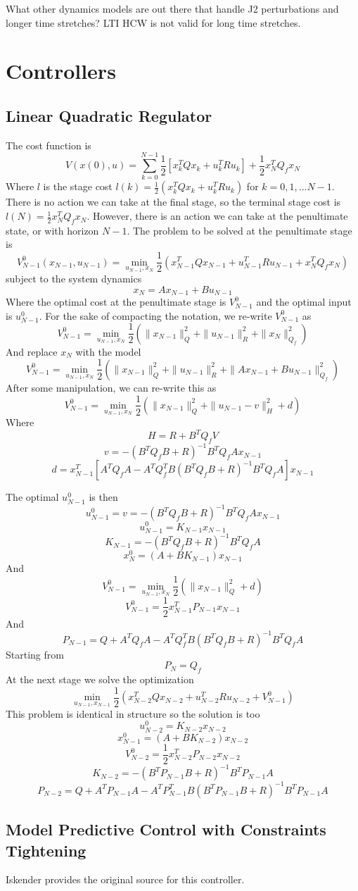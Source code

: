 \documentclass{article}
\begin{document}
What other dynamics models are out there that handle J2 perturbations and longer time stretches? LTI HCW is not valid for long time stretches.
\section{Controllers}
\subsection{Linear Quadratic Regulator}
The cost function is 
$$V(x(0), u) = \sum\limits_{k=0}^{N-1}\frac{1}{2}[x_{k}^TQx_{k} + u_{k}^TRu_{k}] + \frac{1}{2}x_N^TQ_fx_N$$
Where $l$ is the stage cost $l(k) = \frac{1}{2}(x_k^TQx_k + u_k^TRu_k)$ for $k=0,1,...N-1$.
There is no action we can take at the final stage, so the terminal stage cost is $l(N) = \frac{1}{2}x_N^TQ_fx_N$. 
However, there is an action we can take at the penultimate state, or with horizon $N-1$. 
The problem to be solved at the penultimate stage is
$$V^0_{N-1}(x_{N-1}, u_{N-1}) = \min\limits_{u_{N-1}, x_N} \frac{1}{2}(x_{N-1}^TQx_{N-1} + u_{N-1}^TRu_{N-1} + x_N^TQ_fx_N)$$
subject to the system dynamics 
$$x_N = Ax_{N-1} + Bu_{N-1}$$
Where the optimal cost at the penultimate stage is $V^0_{N-1}$ and the optimal input is $u^0_{N-1}$. 
For the sake of compacting the notation, we re-write $V_{N-1}^0$ as
$$V^0_{N-1}=\min\limits_{u_{N-1}, x_N} \frac{1}{2}(\|x_{N-1}\|_Q^2 + \|u_{N-1}\|_R^2 + \|x_{N}\|^2_{Q_f})$$
And replace $x_N$ with the model
$$V^0_{N-1}= \min\limits_{u_{N-1}, x_N}\frac{1}{2}(\|x_{N-1}\|_Q^2 + \|u_{N-1}\|_R^2 + \|Ax_{N-1} + Bu_{N-1}\|^2_{Q_f})$$
After some manipulation, we can re-write this as
$$V^0_{N-1}= \min\limits_{u_{N-1}, x_N}\frac{1}{2}(\|x_{N-1}\|_Q^2 + \|u_{N-1} - v\|_H^2 + d)$$
Where
$$H = R + B^T Q_f V$$
$$v = - (B^T Q_f B + R)^{-1} B^T Q_f A x_{N-1}$$
$$d = x^T_{N-1}[A^T Q_f A - A^T Q_f^T B(B^T Q_f B + R)^{-1} B^T Q_f A]x_{N-1}$$

The optimal $u^0_{N-1}$ is then 
$$u^0_{N-1} = v = - (B^T Q_f B + R)^{-1} B^T Q_f A x_{N-1}$$
$$u^0_{N-1} = K_{N-1} x_{N-1}$$
$$K_{N-1} = - (B^T Q_f B + R)^{-1} B^T Q_f A $$
$$x_N^0 = (A + BK_{N-1})x_{N-1}$$
And 
$$V^0_{N-1}=\min\limits_{u_{N-1}, x_N} \frac{1}{2}(\|x_{N-1}\|_Q^2  + d)$$
$$V_{N-1}^0 = \frac{1}{2}x^T_{N-1}P_{N-1} x_{N-1}$$
And 
$$P_{N-1} = Q + A^T Q_f A - A^T Q_f^T B(B^T Q_f B + R)^{-1} B^T Q_f A$$
Starting from 
$$P_N = Q_f$$
At the next stage we solve the optimization
$$\min\limits_{u_{N-1}, x_{N-1}} \frac{1}{2}(x_{N-2}^TQx_{N-2} + u_{N-2}^TRu_{N-2} + V_{N-1}^0)$$
This problem is identical in structure so the solution is too
$$u^0_{N-2} = K_{N-2} x_{N-2}$$
$$x_{N-1}^0 = (A + BK_{N-2})x_{N-2}$$
$$V_{N-2}^0 = \frac{1}{2}x^T_{N-2}P_{N-2} x_{N-2}$$
$$K_{N-2} = - (B^T P_{N-1} B + R)^{-1} B^T P_{N-1} A $$
$$P_{N-2} = Q + A^T P_{N-1} A - A^T P_{N-1}^T B(B^T P_{N-1} B + R)^{-1} B^T P_{N-1} A$$
\subsection{Model Predictive Control with Constraints Tightening}
Iskender \cite{2018_Iskender} provides the original source for this controller.

\printbibliography
\end{document}
